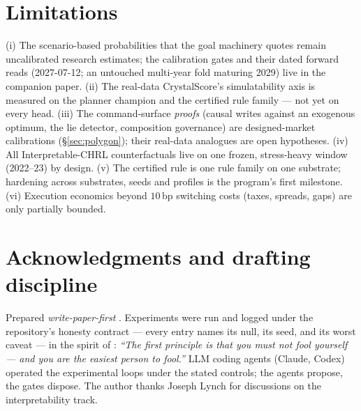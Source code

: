 \documentclass[11pt]{article}
\begin{document}
\section{Limitations}
\label{sec:limits}
(i) The scenario-based probabilities that the goal machinery quotes remain uncalibrated
research estimates; the calibration gates and their dated forward reads (2027-07-12; an
untouched multi-year fold maturing 2029) live in the companion paper. (ii) The real-data
CrystalScore's simulatability axis is measured on the planner champion and the certified rule
family --- not yet on every head. (iii) The command-surface \emph{proofs} (causal writes
against an exogenous optimum, the lie detector, composition governance) are designed-market
calibrations (\S\ref{sec:polygon}); their real-data analogues are open hypotheses. (iv) All
Interpretable-CHRL counterfactuals live on one frozen, stress-heavy window (2022--23) by
design. (v) The certified rule is one rule family on one substrate; hardening across
substrates, seeds and profiles is the program's first milestone. (vi) Execution economics
beyond $10$\,bp switching costs (taxes, spreads, gaps) are only partially bounded.

\section*{Acknowledgments and drafting discipline}
Prepared \emph{write-paper-first} \citep{eisner-paper-first}. Experiments were run and logged
under the repository's honesty contract --- every entry names its null, its seed, and its worst
caveat --- in the spirit of \citet{feynman1974}: \emph{``The first principle is that you must
not fool yourself --- and you are the easiest person to fool.''} LLM coding agents (Claude,
Codex) operated the experimental loops under the stated controls; the agents propose, the gates
dispose. The author thanks Joseph Lynch for discussions on the interpretability track.



\end{document}
